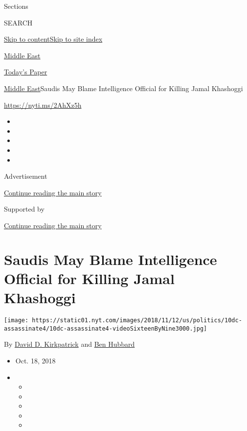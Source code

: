 Sections

SEARCH

\protect\hyperlink{site-content}{Skip to
content}\protect\hyperlink{site-index}{Skip to site index}

\href{https://www.nytimes.com/section/world/middleeast}{Middle East}

\href{https://myaccount.nytimes.com/auth/login?response_type=cookie\&client_id=vi}{}

\href{https://www.nytimes.com/section/todayspaper}{Today's Paper}

\href{/section/world/middleeast}{Middle East}\textbar{}Saudis May Blame
Intelligence Official for Killing Jamal Khashoggi

\url{https://nyti.ms/2AhXz5h}

\begin{itemize}
\item
\item
\item
\item
\item
\end{itemize}

Advertisement

\protect\hyperlink{after-top}{Continue reading the main story}

Supported by

\protect\hyperlink{after-sponsor}{Continue reading the main story}

\hypertarget{saudis-may-blame-intelligence-official-for-killing-jamal-khashoggi}{%
\section{Saudis May Blame Intelligence Official for Killing Jamal
Khashoggi}\label{saudis-may-blame-intelligence-official-for-killing-jamal-khashoggi}}

\texttt{[image: https://static01.nyt.com/images/2018/11/12/us/politics/10dc-assassinate4/10dc-assassinate4-videoSixteenByNine3000.jpg]}

By \href{https://www.nytimes.com/by/david-d-kirkpatrick}{David D.
Kirkpatrick} and \href{https://www.nytimes.com/by/ben-hubbard}{Ben
Hubbard}

\begin{itemize}
\item
  Oct. 18, 2018
\item
  \begin{itemize}
  \item
  \item
  \item
  \item
  \item
  \end{itemize}
\end{itemize}

